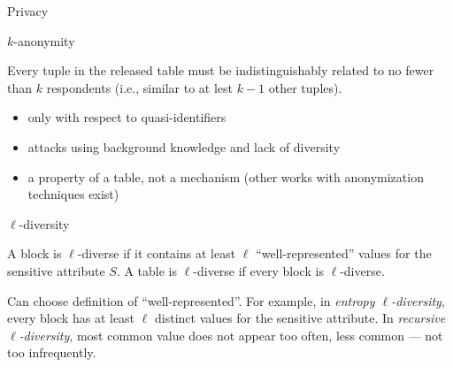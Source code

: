 	\begin{frame}{Privacy}

		\begin{block}{$k$-anonymity~\cite{k-anonymity}}
			\justify%

			Every tuple in the released table must be indistinguishably related to no fewer than $k$ respondents (i.e., similar to at lest $k - 1$ other tuples).

			\begin{itemize}
				\item only with respect to quasi-identifiers
				\item attacks using background knowledge and lack of diversity
				\item a property of a table, not a mechanism (other works with anonymization techniques exist) %
			\end{itemize}

		\end{block}

		\pause%

		\begin{block}{$\ell$-diversity~\cite{l-diversity}}
			\justify%

			A block is $\ell$-diverse if it contains at least $\ell$ ``well-represented'' values for the sensitive attribute $S$.
			A table is $\ell$-diverse if every block is $\ell$-diverse.

			Can choose definition of ``well-represented''.
			For example, in \emph{entropy $\ell$-diversity}, every block has at least $\ell$ distinct values for the sensitive attribute.
			In \emph{recursive $\ell$-diversity}, most common value does not appear too often, less common --- not too infrequently.


		\end{block}


	\end{frame}

